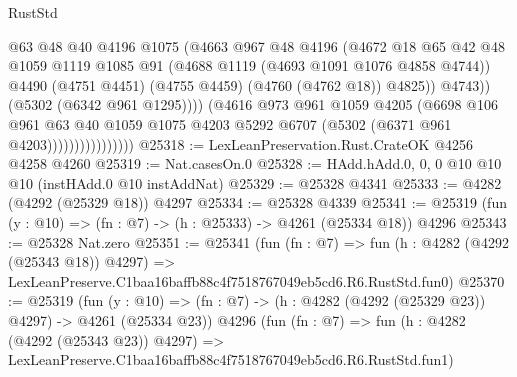 \begin{lexlean}{RustStd}
\begin{coremodule}
                                    @63
                                    @48
                                    @40
                                    @4196
                                    @1075
                                    (@4663
                                      @967
                                      @48
                                      @4196
                                      (@4672
                                        @18
                                        @65
                                        @42
                                        @48
                                        @1059
                                        @1119
                                        @1085
                                        @91
                                        (@4688 @1119 (@4693 @1091 @1076 @4858 @4744))
                                        @4490
                                        (@4751 @4451)
                                        (@4755 @4459)
                                        (@4760 (@4762 @18))
                                        @4825))
                                    @4743))
                                (@5302 (@6342 @961 @1295))))
                            (@4616
                              @973
                              @961
                              @1059
                              @4205
                              (@6698
                                @106
                                @961
                                @63
                                @40
                                @1059
                                @1075
                                @4203
                                @5292
                                @6707
                                (@5302 (@6371 @961 @4203))))))))))))))))
@25318 := LexLeanPreservation.Rust.CrateOK @4256 @4258 @4260
@25319 := Nat.casesOn.{0}
@25328 := HAdd.hAdd.{0, 0, 0} @10 @10 @10 (instHAdd.{0} @10 instAddNat)
@25329 := @25328 @4341
@25333 := @4282 (@4292 (@25329 @18)) @4297
@25334 := @25328 @4339
@25341 := @25319 (fun (y : @10) => (fn : @7) -> (h : @25333) -> @4261 (@25334 @18)) @4296
@25343 := @25328 Nat.zero
@25351 := @25341
    (fun (fn : @7) =>
    fun (h : @4282 (@4292 (@25343 @18)) @4297) =>
    LexLeanPreserve.C1baa16baffb88c4f7518767049eb5cd6.R6.RustStd.fun0)
@25370 := @25319
    (fun (y : @10) => (fn : @7) -> (h : @4282 (@4292 (@25329 @23)) @4297) -> @4261 (@25334 @23))
    @4296
    (fun (fn : @7) =>
    fun (h : @4282 (@4292 (@25343 @23)) @4297) =>
    LexLeanPreserve.C1baa16baffb88c4f7518767049eb5cd6.R6.RustStd.fun1)

\end{coremodule}
\end{lexlean}
